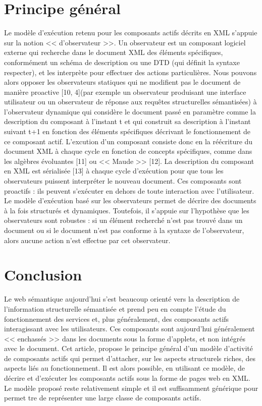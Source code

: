 \documentclass[]{article}
\begin{document}
\section{Principe général}

Le modèle d'exécution retenu pour les composants actifs décrits en XML s'appuie sur la notion << d'observateur >>. Un observateur est un composant logiciel externe qui recherche dans le document
XML des éléments spécifiques, conformément  un schéma de description ou  une DTD (qui définit la syntaxe  respecter), et les interprète pour effectuer des actions particulières. Nous pouvons alors opposer les observateurs statiques qui ne modifient pas le document de manière proactive [10, 4](par exemple un observateur produisant une interface utilisateur ou un observateur de réponse aux requêtes structurelles sémantisées)  à l'observateur dynamique qui considère le document passé en paramètre comme la description du composant à l'instant t et qui construit sa description à l'instant suivant t+1 en fonction des éléments spécifiques décrivant le fonctionnement de ce composant actif. L'excution d'un composant consiste donc en la réécriture du document XML à chaque cycle en fonction de concepts spécifiques, comme dans les algèbres évoluantes [11] ou << Maude >> [12]. La description du composant en XML est sérialisée [13]  à chaque cycle d'exécution pour que tous les observateurs puissent interpréter le  nouveau  document. Ces composants sont proactifs : ils peuvent s'exécuter en dehors de toute interaction avec l'utilisateur.
Le modèle d'exécution basé sur les observateurs permet de décrire des documents à la fois structurés et dynamiques. Toutefois, il s'appuie sur l'hypothèse que les observateurs sont robustes : si un élément recherché n'est pas trouvé dans un document ou si le document n'est pas conforme  à la syntaxe de l'observateur, alors aucune action n'est effectue par cet observateur.

\section{Conclusion}

Le web sémantique aujourd'hui s'est beaucoup orienté vers la description de l'information structurelle sémantisée et prend peu en compte l'étude du fonctionnement des services et, plus généralement, des composants actifs interagissant avec les utilisateurs. Ces composants sont aujourd'hui généralement << enchassés >>  dans les documents sous la forme d'applets, et non intégrés avec le document. Cet article, propose le principe général d'un modèle d'activité  de composants actifs qui permet d'attacher, sur les aspects structurels riches, des aspects liés au fonctionnement. Il est alors possible, en utilisant ce modèle, de décrire et d'exécuter les composants actifs sous la forme de pages web en XML. Le modèle proposé reste relativement simple et il est suffisamment générique pour permet
tre de représenter une large classe de composants actifs.

\cite{expOnto}
\cite{w3c}
\cite{semanticsWS}
\cite{rewritingLogic}
\cite{commsProc}
\cite{wsdl}



\end{document}
